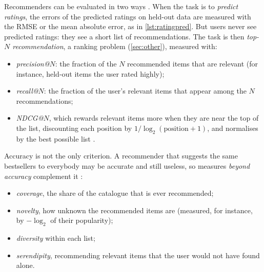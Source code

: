 Recommenders can be evaluated in two ways \citep{herlocker2004evaluating}. When the task is to \emph{predict ratings}, the
errors of the predicted ratings on held-out data are measured with the RMSE or the mean absolute error, as in
\cref{lst:ratingpred}. But users never see predicted ratings: they see a short list of recommendations. The task is then
\emph{top-$N$ recommendation}, a ranking problem (\cref{sec:other}), measured with:
\begin{itemize}
  \item \emph{precision@$N$}: the fraction of the $N$ recommended items that are relevant (for instance, held-out items the
        user rated highly);
  \item \emph{recall@$N$}: the fraction of the user's relevant items that appear among the $N$ recommendations;
  \item \emph{NDCG@$N$}, which rewards relevant items more when they are near the top of the list, discounting each position
        by $1/\log_2(\text{position}+1)$, and normalises by the best possible list \citep{jarvelin2002cumulated}.
\end{itemize}
Accuracy is not the only criterion. A recommender that suggests the same bestsellers to everybody may be accurate and still useless,
so measures \emph{beyond accuracy} complement it \citep{kaminskas2016diversity}: \begin{itemize}
\item \emph{coverage}, the share of the catalogue
that is ever recommended; \item \emph{novelty}, how unknown the recommended items are (measured, for instance, by
$-\log_2$ of their popularity); \item \emph{diversity} within each list; \item \emph{serendipity}, recommending relevant items that the
user would not have found alone.
\end{itemize}


